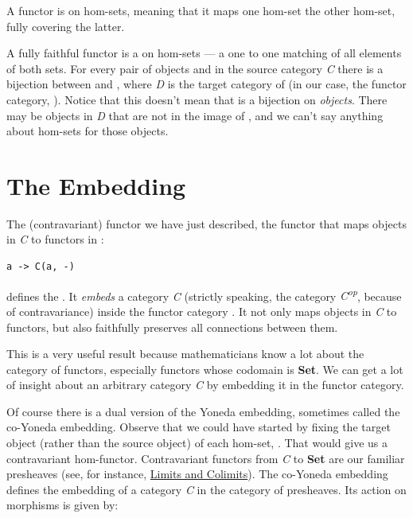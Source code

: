 A  functor is  on hom-sets, meaning that it
maps one hom-set  the other hom-set, fully covering the
latter.

A fully faithful functor  is a  on hom-sets
--- a one to one matching of all elements of both sets. For every pair
of objects  and  in the source category \emph{C}
there is a bijection between  and
, where \emph{D} is the target category of
 (in our case, the functor category, \code{{[}C,\ Set{]}}).
Notice that this doesn't mean that  is a bijection on
\emph{objects}. There may be objects in \emph{D} that are not in the
image of , and we can't say anything about hom-sets for those
objects.

\section{The Embedding}\label{the-embedding}

The (contravariant) functor we have just described, the functor that
maps objects in \emph{C} to functors in \code{{[}C,\ Set{]}}:

\begin{Verbatim}[commandchars=\\\{\}]
a -> C(a, -)
\end{Verbatim}

defines the . It \emph{embeds} a category
\emph{C} (strictly speaking, the category \emph{C\textsuperscript{op}},
because of contravariance) inside the functor category
\code{{[}C,\ Set{]}}. It not only maps objects in \emph{C} to
functors, but also faithfully preserves all connections between them.

This is a very useful result because mathematicians know a lot about the
category of functors, especially functors whose codomain is
\textbf{Set}. We can get a lot of insight about an arbitrary category
\emph{C} by embedding it in the functor category.

Of course there is a dual version of the Yoneda embedding, sometimes
called the co-Yoneda embedding. Observe that we could have started by
fixing the target object (rather than the source object) of each
hom-set, . That would give us a contravariant
hom-functor. Contravariant functors from \emph{C} to \textbf{Set} are
our familiar presheaves (see, for instance,
\href{https://bartoszmilewski.com/2015/04/15/limits-and-colimits/}{Limits
and Colimits}). The co-Yoneda embedding defines the embedding of a
category \emph{C} in the category of presheaves. Its action on morphisms
is given by:

